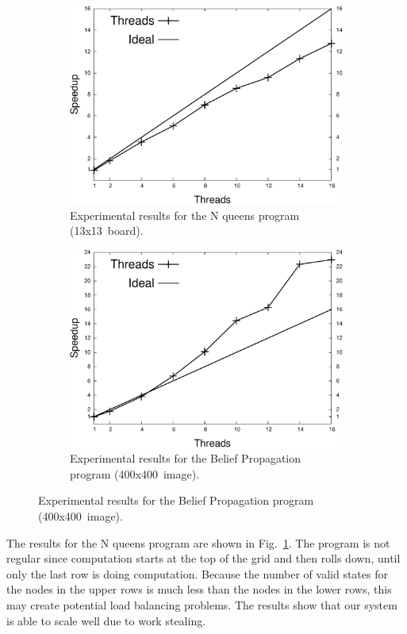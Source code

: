 \begin{figure}[h]
   \centering
   \begin{subfigure}[b]{0.40\textwidth}
      \includegraphics[width=\textwidth]{speedup_8queens-13.pdf}
      \caption{Experimental results for the N queens program (13x13~board).}
      \label{exp:8queens}
   \end{subfigure}
   \begin{subfigure}[b]{0.40\textwidth}
      \includegraphics[width=\textwidth]{speedup_bp-400.pdf}
      \caption{Experimental results for the Belief Propagation program (400x400~image).}
      \label{exp:bp}
   \end{subfigure}
\end{figure}

The results for the N queens program are shown in Fig.~\ref{exp:8queens}. The program is not regular since computation starts at the top of the grid and then rolls down, until only the last row is doing computation. Because the number of valid states for the nodes in the upper rows is much less than the nodes in the lower rows, this may create potential load balancing problems. The results show that our system is able to scale well due to work stealing.

